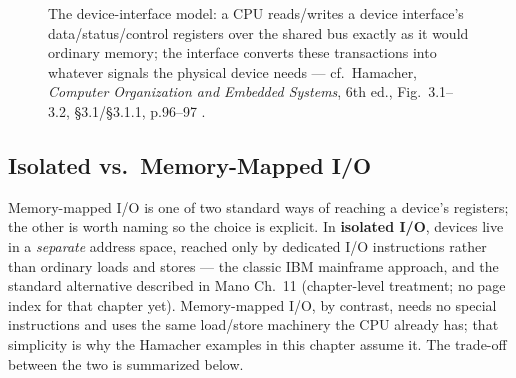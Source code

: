 \documentclass[11pt]{article}
\begin{document}
\begin{figure}[h]
  \centering
  \caption{The device-interface model: a CPU reads/writes a device interface's data/status/control registers over the shared bus exactly as it would ordinary memory; the interface converts these transactions into whatever signals the physical device needs --- cf.\ Hamacher, \textit{Computer Organization and Embedded Systems}, 6th ed., Fig.~3.1--3.2, \S3.1/\S3.1.1, p.96--97 \cite{Hamacher2002_computer_organization}.}
  \label{fig:device-interface}
\end{figure}

\subsection{Isolated vs.\ Memory-Mapped I/O}

Memory-mapped I/O is one of two standard ways of reaching a device's registers; the other is worth naming so the choice is explicit. In \textbf{isolated I/O}, devices live in a \emph{separate} address space, reached only by dedicated I/O instructions rather than ordinary loads and stores --- the classic IBM mainframe approach, and the standard alternative described in Mano Ch.~11 (chapter-level treatment; no page index for that chapter yet). Memory-mapped I/O, by contrast, needs no special instructions and uses the same load/store machinery the CPU already has; that simplicity is why the Hamacher examples in this chapter assume it. The trade-off between the two is summarized below.
\end{document}

